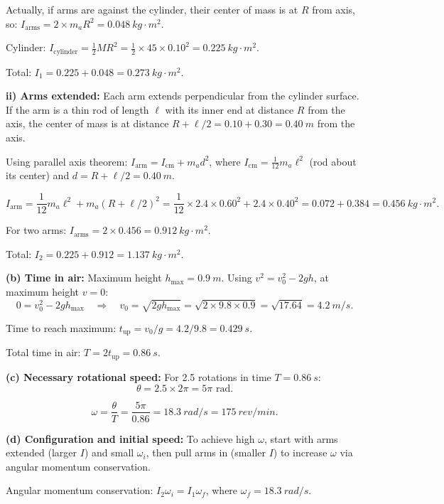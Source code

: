 \documentclass[11pt]{article}
\newcommand{\ans}[1]{\boxed{\displaystyle #1}}
\begin{document}
Actually, if arms are against the cylinder, their center of mass is at $R$ from axis, so: $I_{\text{arms}} = 2 \times m_a R^2 = \SI{0.048}{kg\cdot m^2}$.

Cylinder: $I_{\text{cylinder}} = \frac{1}{2}MR^2 = \frac{1}{2} \times 45 \times 0.10^2 = \SI{0.225}{kg\cdot m^2}$.

Total: $I_1 = 0.225 + 0.048 = \ans{\SI{0.273}{kg\cdot m^2}}$.

\textbf{ii) Arms extended:} Each arm extends perpendicular from the cylinder surface. If the arm is a thin rod of length $\ell$ with its inner end at distance $R$ from the axis, the center of mass is at distance $R + \ell/2 = 0.10 + 0.30 = \SI{0.40}{m}$ from the axis.

Using parallel axis theorem: $I_{\text{arm}} = I_{\text{cm}} + m_a d^2$, where $I_{\text{cm}} = \frac{1}{12}m_a\ell^2$ (rod about its center) and $d = R + \ell/2 = \SI{0.40}{m}$.

\[ I_{\text{arm}} = \frac{1}{12}m_a\ell^2 + m_a(R + \ell/2)^2 = \frac{1}{12} \times 2.4 \times 0.60^2 + 2.4 \times 0.40^2 = 0.072 + 0.384 = \SI{0.456}{kg\cdot m^2}. \]

For two arms: $I_{\text{arms}} = 2 \times 0.456 = \SI{0.912}{kg\cdot m^2}$.

Total: $I_2 = 0.225 + 0.912 = \ans{\SI{1.137}{kg\cdot m^2}}$.

\textbf{(b) Time in air:} Maximum height $h_{\text{max}} = \SI{0.9}{m}$. Using $v^2 = v_0^2 - 2gh$, at maximum height $v = 0$:
\[ 0 = v_0^2 - 2gh_{\text{max}} \quad\Rightarrow\quad v_0 = \sqrt{2gh_{\text{max}}} = \sqrt{2 \times 9.8 \times 0.9} = \sqrt{17.64} = \SI{4.2}{m/s}. \]

Time to reach maximum: $t_{\text{up}} = v_0/g = 4.2/9.8 = \SI{0.429}{s}$.

Total time in air: $T = 2t_{\text{up}} = \ans{\SI{0.86}{s}}$.

\textbf{(c) Necessary rotational speed:} For 2.5 rotations in time $T = \SI{0.86}{s}$:
\[ \theta = 2.5 \times 2\pi = 5\pi \text{ rad}. \]

\[ \omega = \frac{\theta}{T} = \frac{5\pi}{0.86} = \ans{\SI{18.3}{rad/s} = \SI{175}{rev/min}}. \]

\textbf{(d) Configuration and initial speed:} To achieve high $\omega$, start with arms extended (larger $I$) and small $\omega_i$, then pull arms in (smaller $I$) to increase $\omega$ via angular momentum conservation.

Angular momentum conservation: $I_2 \omega_i = I_1 \omega_f$, where $\omega_f = \SI{18.3}{rad/s}$.
\end{document}
